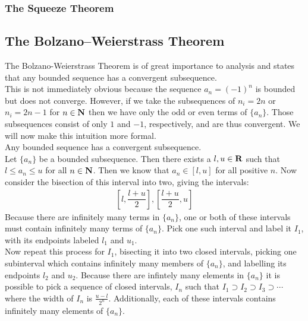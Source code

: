 \documentclass[12pt]{article}
\begin{document}
  \subsubsection{The Squeeze Theorem}

  \subsection{The Bolzano--Weierstrass Theorem}
    The Bolzano-Weierstrass Theorem is of great importance to analysis and states that any bounded sequence has a 
    convergent subsequence.\\
    
    This is not immediately obvious because the sequence $a_n = (-1)^n$ is bounded but does not converge. 
    However, if we take the subsequences of $n_i = 2n$ or $n_i = 2n-1$ for $n \in \mathbf{N}$ then we have only 
    the odd or even terms of $\{a_n\}$. Those subsequences consist of only $1$ and $-1$, respectively, and are 
    thus convergent. We will now make this intuition more formal.\\

    \thm Any bounded sequence has a convergent subsequence.\\

    \pf Let $\{a_n\}$ be a bounded subsequence. Then there exists a $l,u \in \mathbf{R}$ such that $l \leq a_n \leq u$ for
    all $n \in \mathbf{N}$. Then we know that $a_n \in [l,u]$ for all positive $n$. Now consider the bisection of
    this interval into two, giving the intervals:\\
    \begin{align*}
      \left[l, \dfrac{l+u}{2}\right] , \left[\dfrac{l+u}{2},u\right]
    \end{align*}
    Because there are infinitely many terms in $\{a_n\}$, one or both of these intervals must contain infinitely many
    terms of $\{a_n\}$. Pick one such interval and label it $I_1$, with its endpoints labeled $l_1$ and $u_1$.\\

    Now repeat this process for $I_1$, bisecting it into two closed intervals, picking one subinterval which contains 
    infinitely many members of $\{a_n\}$, and labelling its endpoints $l_2$ and $u_2$. Because there are infintely many
    elements in $\{a_n\}$ it is possible to pick a sequence of closed intervals, $I_n$ such that $I_1 \supset I_2
    \supset I_3 \supset \cdots$ where the width of $I_n$ is $\frac{u-l}{2^n}$. Additionally, each of these intervals
    contains infinitely many elements of $\{a_n\}$.\\
\end{document}
